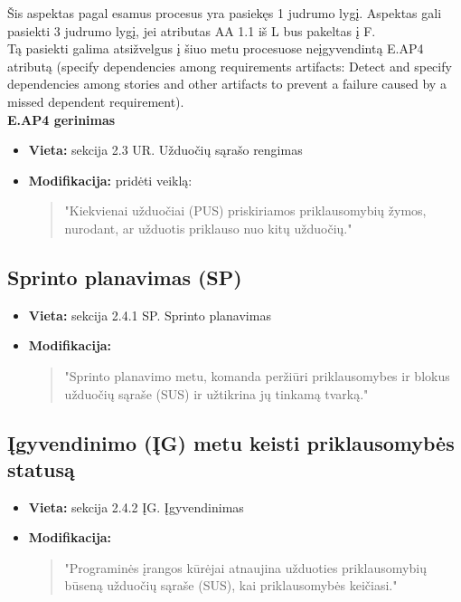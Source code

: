 \documentclass{article}
\begin{document}
Šis aspektas pagal esamus procesus yra pasiekęs 1 judrumo lygį. Aspektas gali pasiekti 3 judrumo lygį, jei atributas
AA 1.1 iš L bus pakeltas į F. \\

Tą pasiekti galima atsižvelgus į šiuo metu procesuose neįgyvendintą E.AP4 atributą (specify dependencies among requirements artifacts: Detect and specify dependencies among stories and other artifacts to prevent a failure caused by a missed dependent requirement). \\

\textbf{E.AP4 gerinimas} 

\begin{itemize}
    \item \textbf{Vieta:} sekcija 2.3 UR. Užduočių sąrašo rengimas
    \item \textbf{Modifikacija:} pridėti veiklą:
    \begin{quote}
        "Kiekvienai užduočiai (PUS) priskiriamos priklausomybių žymos, nurodant, ar užduotis priklauso nuo kitų užduočių."
    \end{quote}
\end{itemize}

\subsection*{Sprinto planavimas (SP)}
\begin{itemize}
    \item \textbf{Vieta:} sekcija 2.4.1 SP. Sprinto planavimas
    \item \textbf{Modifikacija:} 
    \begin{quote}
        "Sprinto planavimo metu, komanda peržiūri priklausomybes ir blokus užduočių sąraše (SUS) ir užtikrina jų tinkamą tvarką."
    \end{quote}
\end{itemize}

\subsection*{Įgyvendinimo (ĮG) metu keisti priklausomybės statusą}
\begin{itemize}
    \item \textbf{Vieta:} sekcija 2.4.2 ĮG. Įgyvendinimas
    \item \textbf{Modifikacija:}
    \begin{quote}
        "Programinės įrangos kūrėjai atnaujina užduoties priklausomybių būseną užduočių sąraše (SUS), kai priklausomybės keičiasi."
    \end{quote}
\end{itemize}
\end{document}
